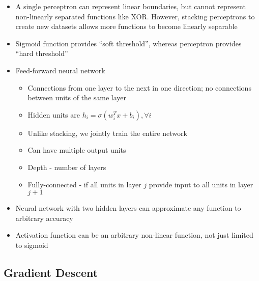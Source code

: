 \documentclass[12pt]{article}
\begin{document}
\begin{itemize}
	\item A single perceptron can represent linear boundaries, but cannot represent non-linearly separated functions like XOR. 
	However, stacking perceptrons to create new datasets allows more functions to become linearly separable
	\item Sigmoid function provides ``soft threshold'', whereas perceptron provides ``hard threshold''
	\item Feed-forward neural network
	\begin{itemize}
		\item Connections from one layer to the next in one direction; no connections between units of the same layer
		\item Hidden units are $h_i = \sigma(w_i^T x + b_i), \forall i$
		\item Unlike stacking, we jointly train the entire network
		\item Can have multiple output units
		\item Depth - number of layers
		\item Fully-connected - if all units in layer $j$ provide input to all units in layer $j + 1$
	\end{itemize}
	\item Neural network with two hidden layers can approximate any function to arbitrary accuracy
	\item Activation function can be an arbitrary non-linear function, not just limited to sigmoid
\end{itemize}

\subsection{Gradient Descent}
\end{document}

